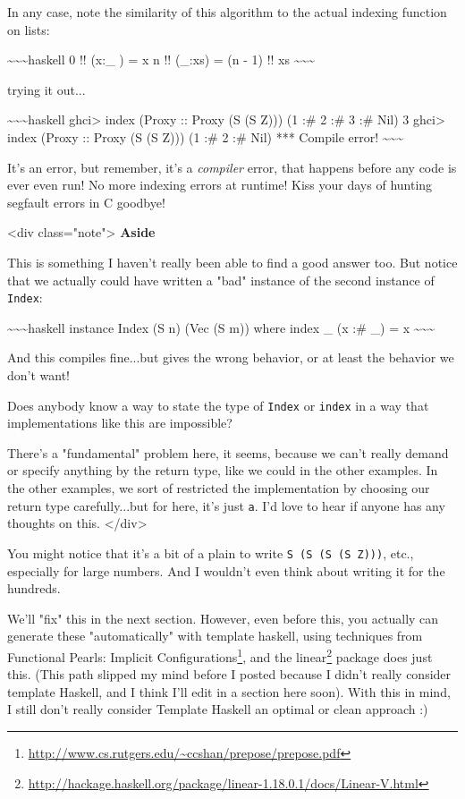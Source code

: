 \documentclass[]{article}
\renewcommand{\href}[2]{#2\footnote{\url{#1}}}
\begin{document}
In any case, note the similarity of this algorithm to the actual indexing
function on lists:

\textasciitilde{}\textasciitilde{}\textasciitilde{}haskell 0 !! (x:\_ ) = x n !!
(\_:xs) = (n - 1) !! xs \textasciitilde{}\textasciitilde{}\textasciitilde{}

trying it out...

\textasciitilde{}\textasciitilde{}\textasciitilde{}haskell ghci\textgreater{}
index (Proxy :: Proxy (S (S Z))) (1 :\# 2 :\# 3 :\# Nil) 3 ghci\textgreater{}
index (Proxy :: Proxy (S (S Z))) (1 :\# 2 :\# Nil) *** Compile error!
\textasciitilde{}\textasciitilde{}\textasciitilde{}

It's an error, but remember, it's a \emph{compiler} error, that happens before
any code is ever even run! No more indexing errors at runtime! Kiss your days of
hunting segfault errors in C goodbye!

\textless{}div class="note"\textgreater{} \textbf{Aside}

This is something I haven't really been able to find a good answer too. But
notice that we actually could have written a "bad" instance of the second
instance of \texttt{Index}:

\textasciitilde{}\textasciitilde{}\textasciitilde{}haskell instance Index (S n)
(Vec (S m)) where index \_ (x :\# \_) = x
\textasciitilde{}\textasciitilde{}\textasciitilde{}

And this compiles fine...but gives the wrong behavior, or at least the behavior
we don't want!

Does anybody know a way to state the type of \texttt{Index} or \texttt{index} in
a way that implementations like this are impossible?

There's a "fundamental" problem here, it seems, because we can't really demand
or specify anything by the return type, like we could in the other examples. In
the other examples, we sort of restricted the implementation by choosing our
return type carefully...but for here, it's just \texttt{a}. I'd love to hear if
anyone has any thoughts on this. \textless{}/div\textgreater{}

You might notice that it's a bit of a plain to write
\texttt{S\ (S\ (S\ (S\ Z)))}, etc., especially for large numbers. And I wouldn't
even think about writing it for the hundreds.

We'll "fix" this in the next section. However, even before this, you actually
can generate these "automatically" with template haskell, using techniques from
\href{http://www.cs.rutgers.edu/~ccshan/prepose/prepose.pdf}{Functional Pearls:
Implicit Configurations}, and the
\href{http://hackage.haskell.org/package/linear-1.18.0.1/docs/Linear-V.html}{linear}
package does just this. (This path slipped my mind before I posted because I
didn't really consider template Haskell, and I think I'll edit in a section here
soon). With this in mind, I still don't really consider Template Haskell an
optimal or clean approach :)
\end{document}
